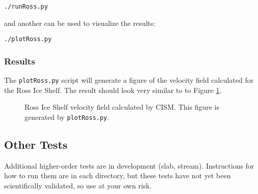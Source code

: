 \texttt{./runRoss.py}

and another can be used to visualize the results:

\texttt{./plotRoss.py}

\subsubsection{Results}
The \texttt{plotRoss.py} script will generate a figure of the velocity field
calculated for the Ross Ice Shelf.  The result should look very similar to to Figure \ref{fig:rossresults}.

\begin{figure}[H!]
	\centering
	\caption{Ross Ice Shelf velocity field calculated by CISM. This figure is generated by \texttt{plotRoss.py}.}
	\label{fig:rossresults}
\end{figure}
\FloatBarrier


\subsection{Other Tests}
Additional higher-order tests are in development (slab, stream).  Instructions
for how to run them are in each directory, but these tests have not yet been 
scientifically validated, so use at your own risk.



